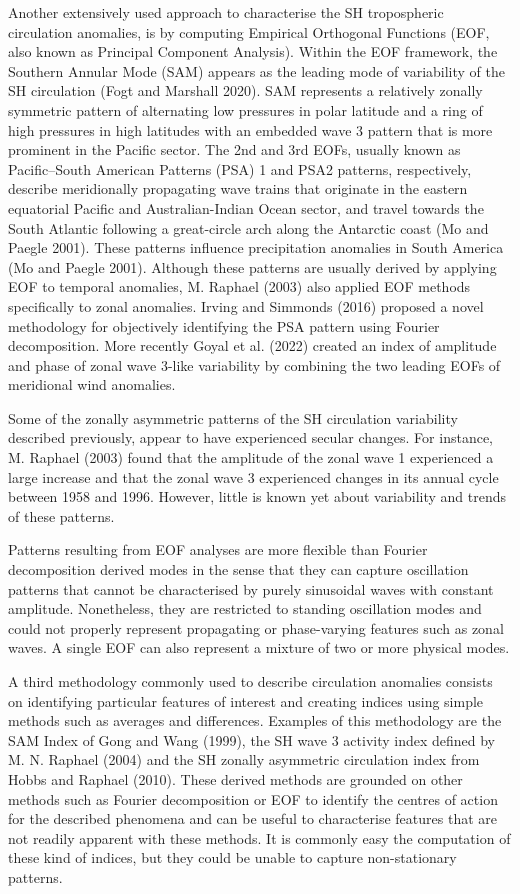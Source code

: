 \documentclass[smallextended]{svjour3}       %
\begin{document}
Another extensively used approach to characterise the SH tropospheric circulation anomalies, is by computing Empirical Orthogonal Functions (EOF, also known as Principal Component Analysis).
Within the EOF framework, the Southern Annular Mode (SAM) appears as the leading mode of variability of the SH circulation (Fogt and Marshall 2020).
SAM represents a relatively zonally symmetric pattern of alternating low pressures in polar latitude and a ring of high pressures in high latitudes with an embedded wave 3 pattern that is more prominent in the Pacific sector.
The 2nd and 3rd EOFs, usually known as Pacific--South American Patterns (PSA) 1 and PSA2 patterns, respectively, describe meridionally propagating wave trains that originate in the eastern equatorial Pacific and Australian-Indian Ocean sector, and travel towards the South Atlantic following a great-circle arch along the Antarctic coast (Mo and Paegle 2001).
These patterns influence precipitation anomalies in South America (Mo and Paegle 2001).
Although these patterns are usually derived by applying EOF to temporal anomalies, M. Raphael (2003) also applied EOF methods specifically to zonal anomalies.
Irving and Simmonds (2016) proposed a novel methodology for objectively identifying the PSA pattern using Fourier decomposition.
More recently Goyal et al. (2022) created an index of amplitude and phase of zonal wave 3-like variability by combining the two leading EOFs of meridional wind anomalies.

Some of the zonally asymmetric patterns of the SH circulation variability described previously, appear to have experienced secular changes.
For instance, M. Raphael (2003) found that the amplitude of the zonal wave 1 experienced a large increase and that the zonal wave 3 experienced changes in its annual cycle between 1958 and 1996.
However, little is known yet about variability and trends of these patterns.

Patterns resulting from EOF analyses are more flexible than Fourier decomposition derived modes in the sense that they can capture oscillation patterns that cannot be characterised by purely sinusoidal waves with constant amplitude.
Nonetheless, they are restricted to standing oscillation modes and could not properly represent propagating or phase-varying features such as zonal waves.
A single EOF can also represent a mixture of two or more physical modes.

A third methodology commonly used to describe circulation anomalies consists on identifying particular features of interest and creating indices using simple methods such as averages and differences.
Examples of this methodology are the SAM Index of Gong and Wang (1999), the SH wave 3 activity index defined by M. N. Raphael (2004) and the SH zonally asymmetric circulation index from Hobbs and Raphael (2010).
These derived methods are grounded on other methods such as Fourier decomposition or EOF to identify the centres of action for the described phenomena and can be useful to characterise features that are not readily apparent with these methods.
It is commonly easy the computation of these kind of indices, but they could be unable to capture non-stationary patterns.
\end{document}
